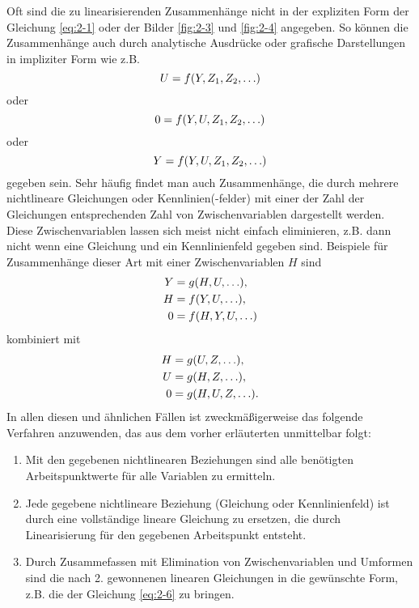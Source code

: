 Oft sind die zu linearisierenden Zusammenhänge nicht in der expliziten Form der Gleichung \eqref{eq:2-1} oder der Bilder \ref{fig:2-3} und \ref{fig:2-4} angegeben.
So können die Zusammenhänge auch durch analytische Ausdrücke oder grafische Darstellungen in impliziter Form wie z.B.
\begin{equation}
    U = f\parentheses*{Y, Z_1, Z_2, \ldots}
\end{equation}
oder
\begin{equation}
    0 = f\parentheses*{Y, U, Z_1, Z_2, \ldots}
\end{equation}
oder
\begin{equation}
    Y = f\parentheses*{Y, U, Z_1, Z_2, \ldots}
\end{equation}
gegeben sein.
Sehr häufig findet man auch Zusammenhänge, die durch mehrere nichtlineare Gleichungen oder Kennlinien(-felder) mit einer der Zahl der Gleichungen entsprechenden Zahl von Zwischenvariablen dargestellt werden.
Diese Zwischenvariablen lassen sich meist nicht einfach eliminieren, z.B. dann nicht wenn eine Gleichung und ein Kennlinienfeld gegeben sind.
Beispiele für Zusammenhänge dieser Art mit einer Zwischenvariablen \(H\) sind
\begin{align}
    \begin{split}
        Y &= g\parentheses*{H, U, \ldots},\\
        H &= f\parentheses*{Y, U, \ldots},\\
        0 &= f\parentheses*{H, Y, U, \ldots}
    \end{split}
\end{align}
kombiniert mit
\begin{align}
    \begin{split}
        H &= g\parentheses*{U, Z, \ldots},\\
        U &= g\parentheses*{H, Z, \ldots},\\
        0 &= g\parentheses*{H, U, Z, \ldots}.
    \end{split}
\end{align}
In allen diesen und ähnlichen Fällen ist zweckmäßigerweise das folgende Verfahren anzuwenden, das aus dem vorher erläuterten unmittelbar folgt:
\begin{enumerate}
    \item Mit den gegebenen nichtlinearen Beziehungen sind alle benötigten Arbeitspunktwerte für alle Variablen zu ermitteln.
    \item Jede gegebene nichtlineare Beziehung (Gleichung oder Kennlinienfeld) ist durch eine vollständige lineare Gleichung zu ersetzen, die durch Linearisierung für den gegebenen Arbeitspunkt entsteht.
    \item Durch Zusammefassen mit Elimination von Zwischenvariablen und Umformen sind die nach 2. gewonnenen linearen Gleichungen in die gewünschte Form, z.B. die der Gleichung \eqref{eq:2-6} zu bringen.
\end{enumerate}
